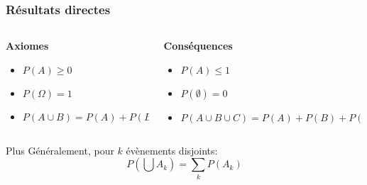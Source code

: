 \documentclass{beamer}
\begin{document}
\begin{frame}[t]
    \frametitle{Résultats directes}
    \begin{columns}
        \small
        \begin{column}{0.4\textwidth}
            \alert{\textbf{Axiomes}}
            \begin{itemize}
                \item $P(A) \geq 0$
                    \vspace*{1cm}
                \item $P(\Omega)  = 1 $
                    \vspace*{1cm}

                \item $P(A\cup B) = P(A) + P(B)  $
            \end{itemize}

        \end{column}
        \begin{column}{0.6\textwidth}
            \small
            \alert{\textbf{Conséquences}}

            \begin{itemize}
                \item $P(A) \leq 1$
                    \vspace*{1cm}
                \item $P(\emptyset) = 0$

                    \vspace*{1cm}

                \item $P(A\cup B \cup C) = P(A) + P(B)  + P(C) $
            \end{itemize}
        \end{column}
    \end{columns}

    \vspace*{1cm}
        Plus Généralement, pour $k$ évènements disjoints:
        \begin{equation}
            P(\bigcup A_k)  = \sum_k P(A_k)
        \end{equation}
    
\end{frame}
\end{document}
